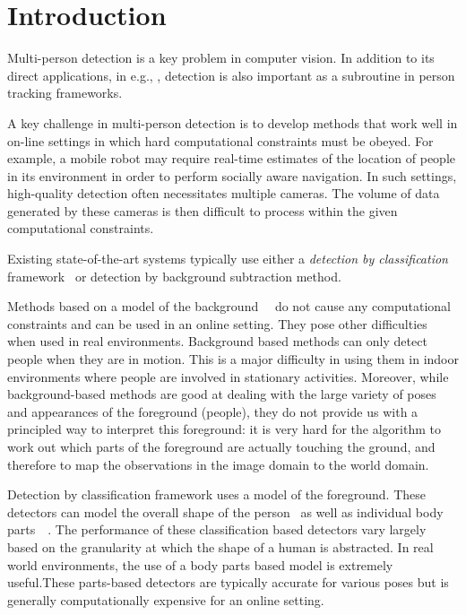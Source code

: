 \documentclass[10pt,twocolumn,letterpaper]{article}
\begin{document}
\section{Introduction}
Multi-person detection is a key problem in computer vision.  In addition to its direct applications, in e.g., , detection is also important as a subroutine in person tracking  frameworks.  

A key challenge in multi-person detection is to develop methods that work well in on-line settings in which hard computational constraints must be obeyed. For example, a mobile robot may require real-time  estimates of the location of people in its environment in order to perform socially aware navigation.  In such settings, high-quality detection often necessitates multiple cameras.  The volume of data generated by these cameras is then difficult to process within the given computational constraints.  

Existing state-of-the-art systems typically use either a \emph{detection by classification} framework~\cite{Pami-11} or detection by background subtraction method.

Methods based on a model of the background~\cite{bk1}~\cite{bk2-bayesian} do not cause any computational constraints and can be used in an online setting. They pose other difficulties when used in real environments. Background based methods can only detect people when they are in motion. This is a major difficulty in using them in indoor environments where people are involved in stationary activities. Moreover, while background-based methods are good at dealing with the large variety of poses and appearances of the foreground (people), they do not provide us with a principled way to interpret this foreground: it is very hard for the algorithm to work out which parts of the foreground are actually touching the ground, and therefore to map the observations in the image domain to the world domain.

Detection by classification framework uses a model of the foreground. These detectors can model the overall shape of the person~\cite{dalaltriggs} as well as individual body parts~\cite{DPM}~\cite{partsDeva}. The performance of these classification based detectors vary largely based on the granularity at which the shape of a human is abstracted. In real world environments, the use of a body parts based model is extremely useful.These parts-based detectors are typically accurate for various poses but is generally computationally expensive for an online setting. 
\end{document}
